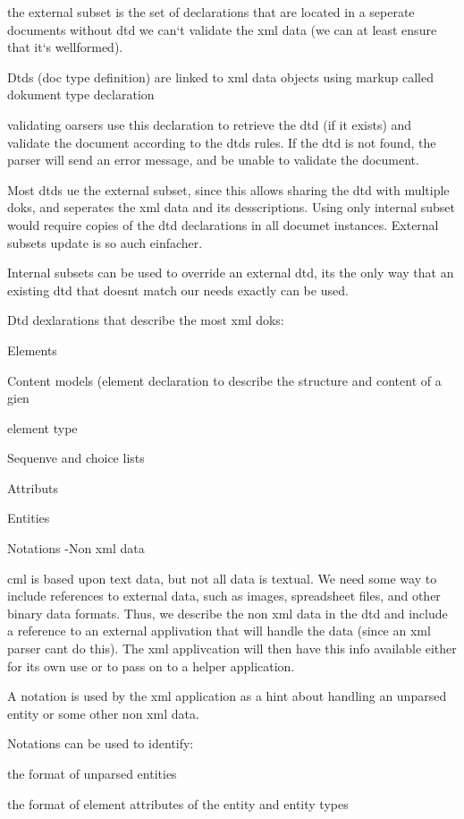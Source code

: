 the external subset is the set of declarations that are located in a seperate documents without dtd we can‘t validate the xml data (we can at least ensure that it‘s wellformed).

Dtds (doc type definition) are linked to xml data objects using markup called dokument type declaration

validating oarsers use this declaration to retrieve the dtd (if it exists) and validate the document according to the dtds rules. If the dtd is not found, the parser will send an error message, and be unable to validate the document.

Most dtds ue the external subset, since this allows sharing the dtd with multiple doks, and seperates the xml data and its desscriptions. Using only internal subset would require copies of the dtd declarations in all documet instances. External subsets update is so auch einfacher.

Internal subsets can be used to override an external dtd, its the only way that an existing dtd that doesnt match our needs exactly can be used.

Dtd dexlarations that describe the most xml doks:

Elements

Content models (element declaration to describe the structure and content of a gien

element type

Sequenve and choice lists

Attributs

Entities

Notations -Non xml data

cml is based upon text data, but not all data is textual. We need some way to include references to external data, such as images, spreadsheet files, and other binary data formats. Thus, we describe the non xml data in the dtd and include a reference to an external applivation that will handle the data (since an xml parser cant do this). The xml applivcation will then have this info available either for its own use or to pass on to a helper application.

A notation is used by the xml application as a hint about handling an unparsed entity or some other non xml data. 

Notations can be used to identify:

the format of unparsed entities

the format of element attributes of the entity and entity types

